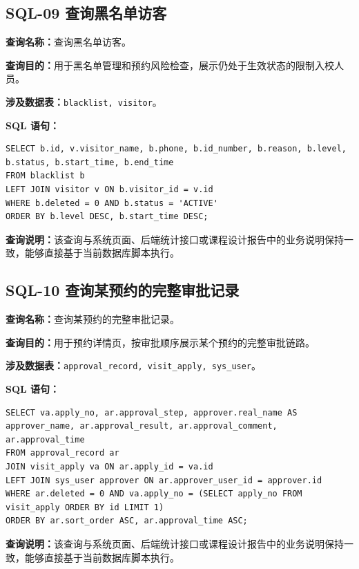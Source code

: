 \subsection{SQL-09 查询黑名单访客}
\textbf{查询名称：}查询黑名单访客。\par
\textbf{查询目的：}用于黑名单管理和预约风险检查，展示仍处于生效状态的限制入校人员。\par
\textbf{涉及数据表：}\texttt{blacklist, visitor}。\par
\textbf{SQL 语句：}
\begin{lstlisting}[style=sqlstyle]
SELECT b.id, v.visitor_name, b.phone, b.id_number, b.reason, b.level, b.status, b.start_time, b.end_time
FROM blacklist b
LEFT JOIN visitor v ON b.visitor_id = v.id
WHERE b.deleted = 0 AND b.status = 'ACTIVE'
ORDER BY b.level DESC, b.start_time DESC;
\end{lstlisting}
\textbf{查询说明：}该查询与系统页面、后端统计接口或课程设计报告中的业务说明保持一致，能够直接基于当前数据库脚本执行。

\subsection{SQL-10 查询某预约的完整审批记录}
\textbf{查询名称：}查询某预约的完整审批记录。\par
\textbf{查询目的：}用于预约详情页，按审批顺序展示某个预约的完整审批链路。\par
\textbf{涉及数据表：}\texttt{approval\_record, visit\_apply, sys\_user}。\par
\textbf{SQL 语句：}
\begin{lstlisting}[style=sqlstyle]
SELECT va.apply_no, ar.approval_step, approver.real_name AS approver_name, ar.approval_result, ar.approval_comment, ar.approval_time
FROM approval_record ar
JOIN visit_apply va ON ar.apply_id = va.id
LEFT JOIN sys_user approver ON ar.approver_user_id = approver.id
WHERE ar.deleted = 0 AND va.apply_no = (SELECT apply_no FROM visit_apply ORDER BY id LIMIT 1)
ORDER BY ar.sort_order ASC, ar.approval_time ASC;
\end{lstlisting}
\textbf{查询说明：}该查询与系统页面、后端统计接口或课程设计报告中的业务说明保持一致，能够直接基于当前数据库脚本执行。

